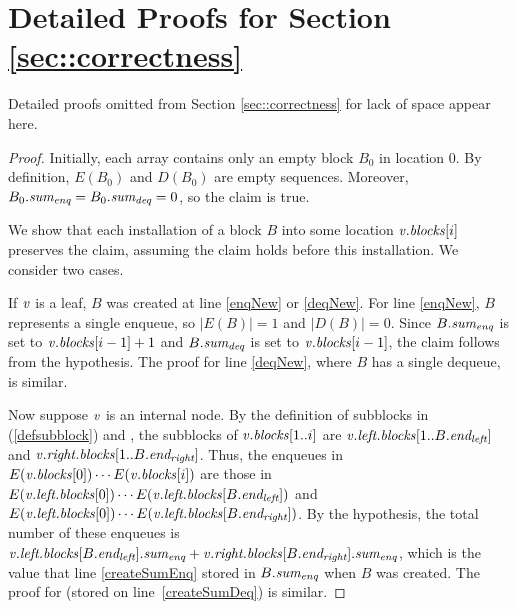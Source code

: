 
\section{Detailed Proofs for Section \ref{sec::correctness}}
\label{app::tracingDetails}

Detailed proofs omitted from Section \ref{sec::correctness} for lack of space appear here.

\sumRes*
\begin{proof}
Initially, each  array  contains only an empty block $B_0$ in location 0.
By definition, $E(B_0)$ and $D(B_0)$ are empty sequences.
Moreover, $B_0.\mbox{\textit{sum\textsubscript{enq}}} = B_0.\mbox{\textit{sum\textsubscript{deq}}} = 0$, so the claim is true.

We show that each installation of a block $B$ into some location $\mbox{\textnormal{\textit{v}}}.\mbox{\textit{blocks}}[i]$ preserves the claim,
assuming the claim holds before this installation.  We consider two cases.

If $\mbox{\textnormal{\textit{v}}}$ is a leaf, $B$ was created at line \ref{enqNew} or \ref{deqNew}.
For line \ref{enqNew}, $B$ represents a single enqueue, so $|E(B)|=1$ and $|D(B)|=0$.
Since $B.\mbox{\textit{sum\textsubscript{enq}}}$ is set to $\mbox{\textnormal{\textit{v}}}.\mbox{\textit{blocks}}[i-1]+1$ and
$B.\mbox{\textit{sum\textsubscript{deq}}}$ is set to $\mbox{\textnormal{\textit{v}}}.\mbox{\textit{blocks}}[i-1]$, the claim follows from the hypothesis.
The proof for line \ref{deqNew}, where $B$ has a single dequeue, is similar.

Now suppose $\mbox{\textnormal{\textit{v}}}$ is an internal node. By the definition of subblocks in (\ref{defsubblock}) and , the
subblocks of $\mbox{\textnormal{\textit{v}}}.\mbox{\textit{blocks}}[1..i]$ are $\mbox{\textnormal{\textit{v}}}.\mbox{\textit{left.blocks}}[1..B.\mbox{\textit{end\textsubscript{left}}}]$ 
and $\mbox{\textnormal{\textit{v}}}.\mbox{\textit{right.blocks}}[1..B.\mbox{\textit{end\textsubscript{right}}}]$.
Thus, the enqueues in $E(\mbox{\textnormal{\textit{v}}}.\mbox{\textit{blocks}}[0])\cdots E(\mbox{\textnormal{\textit{v}}}.\mbox{\textit{blocks}}[i])$ are those in
$E(\mbox{\textnormal{\textit{v}}}.\mbox{\textit{left.blocks}}[0]) \cdots E(\mbox{\textnormal{\textit{v}}}.\mbox{\textit{left.blocks}}[B.\mbox{\textit{end\textsubscript{left}}}])$ and
$E(\mbox{\textnormal{\textit{v}}}.\mbox{\textit{left.blocks}}[0]) \cdots E(\mbox{\textnormal{\textit{v}}}.\mbox{\textit{left.blocks}}[B.\mbox{\textit{end\textsubscript{right}}}])$.
By the hypothesis, the total number of these enqueues is $\mbox{\textnormal{\textit{v}}}.\mbox{\textit{left.blocks}}[B.\mbox{\textit{end\textsubscript{left}}}].\mbox{\textit{sum\textsubscript{enq}}} + \mbox{\textnormal{\textit{v}}}.\mbox{\textit{right.blocks}}[B.\mbox{\textit{end\textsubscript{right}}}].\mbox{\textit{sum\textsubscript{enq}}}$, which is the value that line \ref{createSumEnq} stored in $B.\mbox{\textit{sum\textsubscript{enq}}}$ when $B$ was created.
The proof for  (stored on line~\ref{createSumDeq}) is similar.
\end{proof}

